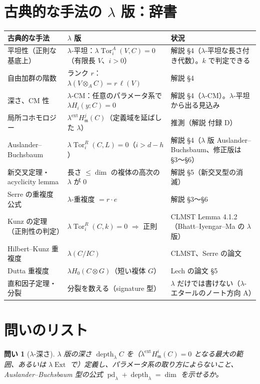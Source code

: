 \documentclass[11pt,a4paper]{ltjsarticle}
\theoremstyle{plain}
\newtheorem{question}{問い}
\theoremstyle{definition}
\theoremstyle{remark}
\theoremstyle{plain}
\newcommand{\m}{\mathfrak{m}}
\newcommand{\Tor}{\operatorname{Tor}}
\newcommand{\Ext}{\operatorname{Ext}}
\newcommand{\pd}{\operatorname{pd}}
\newcommand{\depth}{\operatorname{depth}}
\begin{document}
\section{古典的な手法の $\lambda$ 版：辞書}

\begin{center}
\small
\begin{tabularx}{\textwidth}{>{\raggedright}p{3.4cm}>{\raggedright}X>{\raggedright\arraybackslash}p{3.6cm}}
\toprule
古典的な手法 & $\lambda$ 版 & 状況 \\
\midrule
平坦性（正則な基底上） & $\lambda$-平坦：$\lambda\Tor^A_i(V,C) = 0$（有限長 $V$、$i>0$） & 解説 §4（$\lambda$-平坦な長さ付き代数）。$k$ で判定できる \\
自由加群の階数 & ランク $r$：$\lambda(V\otimes_A C) = r\,\ell(V)$ & 解説 §4 \\
深さ、CM 性 & $\lambda$-CM：任意のパラメータ系で $\lambda H_i(y;C) = 0$ & 解説 §4（$\lambda$-CM）。$\lambda$-平坦から出る見込み \\
局所コホモロジー & $\lambda^{\mathrm{ext}}H^j_\m(C)$（定義域を延ばした $\lambda$） & 推測（解説 付録 D） \\
Auslander--Buchsbaum & $\lambda\Tor^R_i(C,L) = 0$（$i>d-h$） & 解説 §4（$\lambda$ 版 Auslander--Buchsbaum、修正版は§3〜§6） \\
新交叉定理・acyclicity lemma & 長さ $\le\dim$ の複体の高次の $\lambda$ が $0$ & 解説 §5（新交叉型の消滅） \\
Serre の重複度公式 & $\lambda$-重複度 $= r\cdot e$ & 解説 §3〜§6 \\
Kunz の定理（正則性の判定） & $\lambda\Tor_i^R(C,k) = 0$ $\Rightarrow$ 正則 & CLMST Lemma 4.1.2（Bhatt--Iyengar--Ma の $\lambda$ 版） \\
Hilbert--Kunz 重複度 & $\lambda(C/IC)$ & CLMST、Serre の論文 \\
Dutta 重複度 & $\lambda H_0(C\otimes G)$（短い複体 $G$） & Lech の論文 §5 \\
直和因子定理・分裂 & 分裂を数える（signature 型） & $\lambda$ だけでは書けない（$\lambda$-エタールのノート方向 A） \\
\bottomrule
\end{tabularx}
\end{center}

\section{問いのリスト}

\begin{question}[$\lambda$-深さ]
$\lambda$ 版の深さ $\depth_\lambda C$ を（$\lambda^{\mathrm{ext}}H^i_\m(C) = 0$ となる最大の範囲、あるいは $\lambda\Ext$ で）定義し、パラメータ系の取り方によらないこと、Auslander--Buchsbaum 型の公式 $\pd_\lambda + \depth_\lambda = \dim$ を示せるか。
\end{question}
\end{document}
